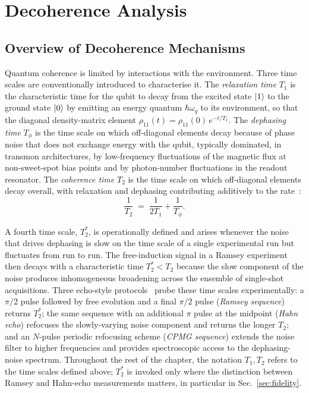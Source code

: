 

\section{Decoherence Analysis}
\label{sec:decoherence}

\subsection{Overview of Decoherence Mechanisms}

Quantum coherence is limited by interactions with the environment. Three time scales are conventionally introduced to characterise it. The \emph{relaxation time} $T_1$ is the characteristic time for the qubit to decay from the excited state $\ket{1}$ to the ground state $\ket{0}$ by emitting an energy quantum $\hbar\omega_q$ to its environment, so that the diagonal density-matrix element $\rho_{11}(t) = \rho_{11}(0)\,e^{-t/T_1}$. The \emph{dephasing time} $T_\phi$ is the time scale on which off-diagonal elements decay because of phase noise that does not exchange energy with the qubit, typically dominated, in transmon architectures, by low-frequency fluctuations of the magnetic flux at non-sweet-spot bias points and by photon-number fluctuations in the readout resonator. The \emph{coherence time} $T_2$ is the time scale on which off-diagonal elements decay overall, with relaxation and dephasing contributing additively to the rate~\cite{krantz2019,blais2021circuit}:
\begin{equation}
\frac{1}{T_2} \;=\; \frac{1}{2T_1} + \frac{1}{T_\phi}.
\label{eq:t2_relation}
\end{equation}

A fourth time scale, $T_2^*$, is operationally defined and arises whenever the noise that drives dephasing is slow on the time scale of a single experimental run but fluctuates from run to run. The free-induction signal in a Ramsey experiment then decays with a characteristic time $T_2^* < T_2$ because the slow component of the noise produces inhomogeneous broadening across the ensemble of single-shot acquisitions. Three echo-style protocols~\cite{krantz2019,kjaergaard2020} probe these time scales experimentally: a $\pi/2$ pulse followed by free evolution and a final $\pi/2$ pulse (\emph{Ramsey sequence}) returns $T_2^*$; the same sequence with an additional $\pi$ pulse at the midpoint (\emph{Hahn echo}) refocuses the slowly-varying noise component and returns the longer $T_2$; and an $N$-pulse periodic refocusing scheme (\emph{CPMG sequence}) extends the noise filter to higher frequencies and provides spectroscopic access to the dephasing-noise spectrum. Throughout the rest of the chapter, the notation $T_1, T_2$ refers to the time scales defined above; $T_2^*$ is invoked only where the distinction between Ramsey and Hahn-echo measurements matters, in particular in Sec.~\ref{sec:fidelity}.

